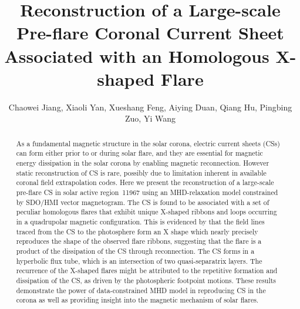 \documentclass[twocolumn]{aastex6} %
\begin{document}
\begin{CJK*}{UTF8}{gbsn}

  \title{Reconstruction of a Large-scale Pre-flare Coronal Current
    Sheet Associated with an Homologous X-shaped Flare}


\author{
  Chaowei Jiang,
  Xiaoli Yan,
  Xueshang Feng,
  Aiying Duan,
  Qiang Hu,
  Pingbing Zuo,
  Yi Wang}









\begin{abstract}
  As a fundamental magnetic structure in the solar corona,
  electric current sheets (CSs) can form either prior to or during
  solar flare, and they are essential for magnetic energy dissipation
  in the solar corona by enabling magnetic reconnection. {However static reconstruction of
  CS is rare, possibly due to limitation inherent in available coronal field extrapolation codes}. Here we present the
  reconstruction of a large-scale pre-flare CS in solar active region~11967
  using an MHD-relaxation model constrained by
  SDO/HMI vector magnetogram. The CS is found to be associated with a set of peculiar homologous
  flares that exhibit unique X-shaped ribbons and loops occurring in a
  quadrupolar magnetic configuration. {This is evidenced by that} the field lines traced from the CS to
  the photosphere form an X shape which nearly precisely reproduces the
  shape of the observed flare ribbons, {suggesting} that the flare
  is a product of the dissipation of the CS through
  reconnection. The CS forms in a hyperbolic flux tube, which is an intersection of two
  quasi-separatrix layers. The recurrence of the X-shaped flares {might} be attributed
  to the repetitive formation and dissipation of the CS, as driven by the photospheric footpoint motions.
  These results demonstrate the power of data-constrained MHD model
  in reproducing CS in the corona as well as providing insight into
  the magnetic mechanism of solar flares.
\end{abstract}



\end{CJK*}
\end{document}
